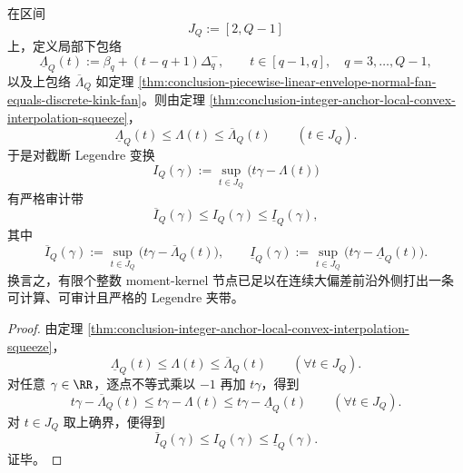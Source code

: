 \begin{theorem}\label{thm:conclusion-finite-node-legendre-audit-band}
在区间
\[
J_Q:=[2,Q-1]
\]
上，定义局部下包络
\[
\underline\Lambda_Q(t):=
\beta_q+(t-q+1)\Delta_q^-,
\qquad
t\in[q-1,q],\quad q=3,\dots,Q-1,
\]
以及上包络 \(\overline\Lambda_Q\) 如定理 \ref{thm:conclusion-piecewise-linear-envelope-normal-fan-equals-discrete-kink-fan}。则由定理 \ref{thm:conclusion-integer-anchor-local-convex-interpolation-squeeze}，
\[
\underline\Lambda_Q(t)\le \Lambda(t)\le \overline\Lambda_Q(t)
\qquad (t\in J_Q).
\]
于是对截断 Legendre 变换
\[
I_Q(\gamma):=\sup_{t\in J_Q}\bigl(t\gamma-\Lambda(t)\bigr)
\]
有严格审计带
\[
\overline I_Q(\gamma)\le I_Q(\gamma)\le \underline I_Q(\gamma),
\]
其中
\[
\overline I_Q(\gamma):=\sup_{t\in J_Q}\bigl(t\gamma-\overline\Lambda_Q(t)\bigr),
\qquad
\underline I_Q(\gamma):=\sup_{t\in J_Q}\bigl(t\gamma-\underline\Lambda_Q(t)\bigr).
\]
换言之，有限个整数 moment-kernel 节点已足以在连续大偏差前沿外侧打出一条可计算、可审计且严格的 Legendre 夹带。
\end{theorem}
\begin{proof}
由定理 \ref{thm:conclusion-integer-anchor-local-convex-interpolation-squeeze}，
\[
\underline\Lambda_Q(t)\le \Lambda(t)\le \overline\Lambda_Q(t)
\qquad (\forall t\in J_Q).
\]
对任意 \(\gamma\in\RR\)，逐点不等式乘以 \(-1\) 再加 \(t\gamma\)，得到
\[
t\gamma-\overline\Lambda_Q(t)
\le
t\gamma-\Lambda(t)
\le
t\gamma-\underline\Lambda_Q(t)
\qquad (\forall t\in J_Q).
\]
对 \(t\in J_Q\) 取上确界，便得到
\[
\overline I_Q(\gamma)\le I_Q(\gamma)\le \underline I_Q(\gamma).
\]
证毕。
\end{proof}
